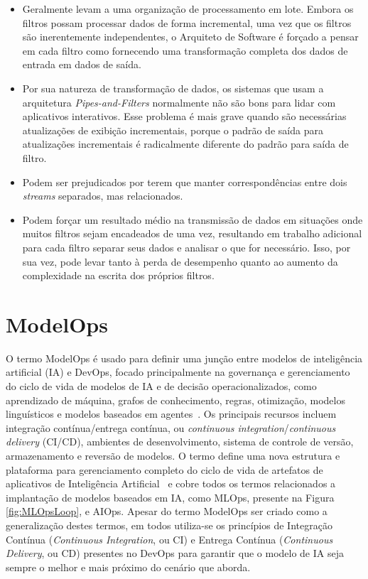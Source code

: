 \documentclass[portugues]{ic-tese}
\begin{document}
\begin{itemize}
\item Geralmente levam a uma organização de processamento em lote. Embora os filtros possam processar dados de forma incremental, uma vez que os filtros são inerentemente independentes, o Arquiteto de Software é forçado a pensar em cada filtro como fornecendo uma transformação completa dos dados de entrada em dados de saída. 
\item Por sua natureza de transformação de dados, os sistemas que usam a arquitetura \textit{Pipes-and-Filters} normalmente não são bons para lidar com aplicativos interativos. Esse problema é mais grave quando são necessárias atualizações de exibição incrementais, porque o padrão de saída para atualizações incrementais é radicalmente diferente do padrão para saída de filtro.
\item Podem ser prejudicados por terem que manter correspondências entre dois \textit{streams} separados, mas relacionados. 
\item Podem forçar um resultado médio na transmissão de dados em situações onde muitos filtros sejam encadeados de uma vez, resultando em trabalho adicional para cada filtro separar seus dados e analisar o que for necessário. Isso, por sua vez, pode levar tanto à perda de desempenho quanto ao aumento da complexidade na escrita dos próprios filtros.
\end{itemize}

\section{ModelOps}
\label{sec:ModelOps}

O termo ModelOps é usado para definir uma junção entre modelos de inteligência artificial (IA) e DevOps, focado principalmente na governança e gerenciamento do ciclo de vida de modelos de IA e de decisão operacionalizados, como aprendizado de máquina, grafos de conhecimento, regras, otimização, modelos linguísticos e modelos baseados em agentes~\cite{Gartner_2022}. Os principais recursos incluem integração contínua/entrega contínua, ou \textit{continuous integration}/\textit{continuous delivery} (CI/CD), ambientes de desenvolvimento, sistema de controle de versão, armazenamento e reversão de modelos. O termo define uma nova estrutura e plataforma para gerenciamento completo do ciclo de vida de artefatos de aplicativos de Inteligência Artificial~\cite{Hummer_2019} e cobre todos os termos relacionados a implantação de modelos baseados em IA, como MLOps, presente na Figura \ref{fig:MLOpsLoop}, e AIOps. Apesar do termo ModelOps ser criado como a generalização destes termos, em todos utiliza-se os princípios de Integração Contínua (\textit{Continuous Integration}, ou CI) e Entrega Contínua (\textit{Continuous Delivery}, ou CD) presentes no DevOps para garantir que o modelo de IA seja sempre o melhor e mais próximo do cenário que aborda.
\end{document}
